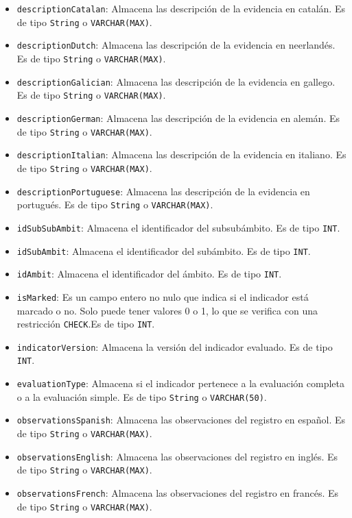 \begin{itemize}
\begin{itemize}
        \item \texttt{descriptionCatalan}: Almacena las descripción de la evidencia en catalán. Es de tipo \texttt{String} o \texttt{VARCHAR(MAX)}.
        \item \texttt{descriptionDutch}: Almacena las descripción de la evidencia en neerlandés. Es de tipo \texttt{String} o \texttt{VARCHAR(MAX)}.
        \item \texttt{descriptionGalician}: Almacena las descripción de la evidencia en gallego. Es de tipo \texttt{String} o \texttt{VARCHAR(MAX)}.
        \item \texttt{descriptionGerman}: Almacena las descripción de la evidencia en alemán. Es de tipo \texttt{String} o \texttt{VARCHAR(MAX)}.
        \item \texttt{descriptionItalian}: Almacena las descripción de la evidencia en italiano. Es de tipo \texttt{String} o \texttt{VARCHAR(MAX)}.
        \item \texttt{descriptionPortuguese}: Almacena las descripción de la evidencia en portugués. Es de tipo \texttt{String} o \texttt{VARCHAR(MAX)}.
      \item \texttt{idSubSubAmbit}: Almacena el identificador del subsubámbito. Es de tipo \texttt{INT}.
      \item \texttt{idSubAmbit}: Almacena el identificador del subámbito. Es de tipo \texttt{INT}.
      \item \texttt{idAmbit}: Almacena el identificador del ámbito. Es de tipo \texttt{INT}.
      \item \texttt{isMarked}: Es un campo entero no nulo que indica si el indicador está marcado o no. Solo puede tener valores 0 o 1, lo que se verifica con una restricción \texttt{CHECK}.Es de tipo \texttt{INT}.
      \item \texttt{indicatorVersion}: Almacena la versión del indicador evaluado. Es de tipo \texttt{INT}.
      \item \texttt{evaluationType}: Almacena si el indicador pertenece a la evaluación completa o a la evaluación simple. Es de tipo \texttt{String} o \texttt{VARCHAR(50)}.
      \item \texttt{observationsSpanish}: Almacena las observaciones del registro en español. Es de tipo \texttt{String} o \texttt{VARCHAR(MAX)}.
        \item \texttt{observationsEnglish}: Almacena las observaciones del registro en inglés. Es de tipo \texttt{String} o \texttt{VARCHAR(MAX)}.
        \item \texttt{observationsFrench}: Almacena las observaciones del registro en francés. Es de tipo \texttt{String} o \texttt{VARCHAR(MAX)}.

\end{itemize}
\end{itemize}
